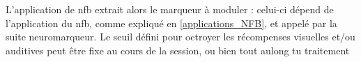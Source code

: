 L'application de \gls{nfb} extrait alors le marqueur à moduler : celui-ci dépend de l'application du \gls{nfb}, comme expliqué en \ref{applications_NFB},
et appelé par la suite neuromarqueur. Le seuil défini pour octroyer les récompenses visuelles et/ou auditives peut être fixe au cours de la session, ou
bien tout aulong tu traitement 


% 



